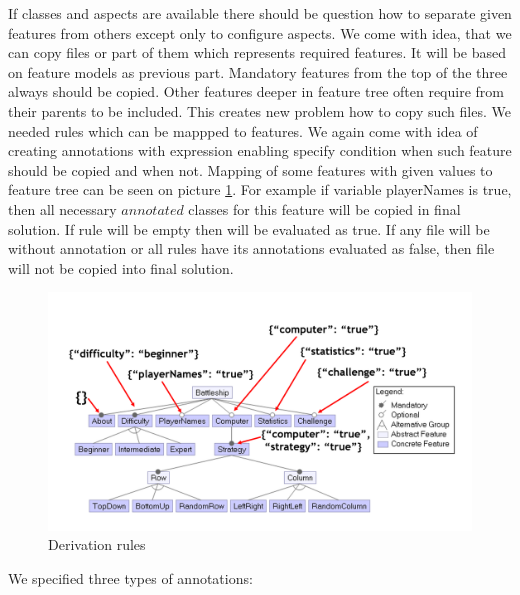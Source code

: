 \documentclass[11pt,slovak,a4paper,twoside]{article}
\begin{document}
If classes and aspects are available there should be question how to separate given features from others except only to configure aspects. We come with idea, that we can copy files or part of them which represents required features. It will be based on feature models as previous part. Mandatory features from the top of the three always should be copied. Other features deeper in feature tree often require from their parents to be included. This creates new problem how to copy such files. We needed rules which can be mappped to features. We again come with idea of creating annotations with expression enabling specify condition when such feature should be copied and when not. Mapping of some features with given values to feature tree can be seen on picture \ref{derivationRules}. For example if variable playerNames is true, then all necessary \(annotated\) classes for this feature will be copied in final solution. If rule will be empty then will be evaluated as true. If any file will be without annotation or all rules have its annotations evaluated as false, then file will not be copied into final solution.

\begin{figure}[H]  %
					\begin{center}
									\includegraphics[width=\linewidth]{fig/derivationRules.png}
									\caption{Derivation rules}
									\label{derivationRules}
					\end{center}
\end{figure}


We specified three types of annotations:
\end{document}
